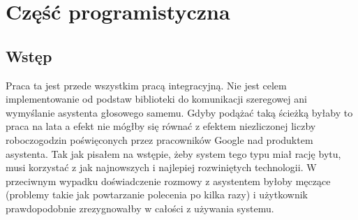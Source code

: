 \documentclass[declaration,shortabstract, inz]{iithesis}
\begin{document}
\section{Część programistyczna}
\subsection{Wstęp}
    Praca ta jest przede wszystkim pracą integracyjną. Nie jest celem implementowanie od podstaw biblioteki do komunikacji szeregowej ani wymyślanie asystenta głosowego samemu. Gdyby podążać taką ścieżką byłaby to praca na lata a efekt nie mógłby się równać z efektem niezliczonej liczby roboczogodzin poświęconych przez pracowników Google nad produktem asystenta. Tak jak pisałem na wstępie, żeby system tego typu miał rację bytu, musi korzystać z jak najnowszych i najlepiej rozwiniętych technologii. W przeciwnym wypadku doświadczenie rozmowy z asystentem byłoby męczące (problemy takie jak powtarzanie polecenia po kilka razy) i użytkownik prawdopodobnie zrezygnowałby w całości z używania systemu. 
    
\end{document}
